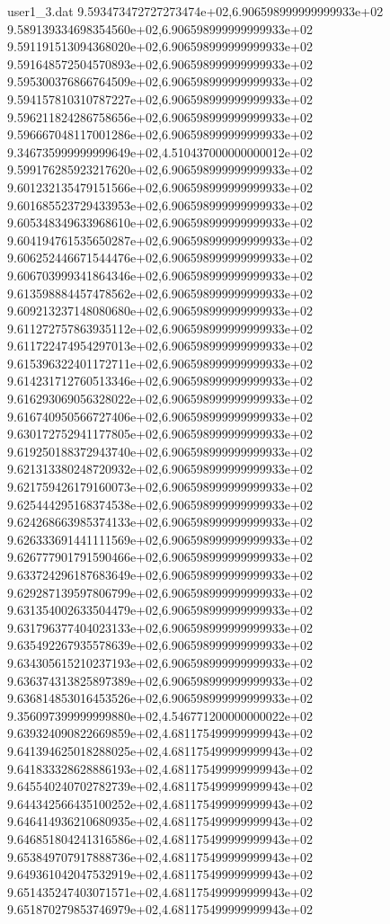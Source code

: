\begin{filecontents}{user1_3.dat}
9.593473472727273474e+02,6.906598999999999933e+02
9.589139334698354560e+02,6.906598999999999933e+02
9.591191513094368020e+02,6.906598999999999933e+02
9.591648572504570893e+02,6.906598999999999933e+02
9.595300376866764509e+02,6.906598999999999933e+02
9.594157810310787227e+02,6.906598999999999933e+02
9.596211824286758656e+02,6.906598999999999933e+02
9.596667048117001286e+02,6.906598999999999933e+02
9.346735999999999649e+02,4.510437000000000012e+02
9.599176285923217620e+02,6.906598999999999933e+02
9.601232135479151566e+02,6.906598999999999933e+02
9.601685523729433953e+02,6.906598999999999933e+02
9.605348349633968610e+02,6.906598999999999933e+02
9.604194761535650287e+02,6.906598999999999933e+02
9.606252446671544476e+02,6.906598999999999933e+02
9.606703999341864346e+02,6.906598999999999933e+02
9.613598884457478562e+02,6.906598999999999933e+02
9.609213237148080680e+02,6.906598999999999933e+02
9.611272757863935112e+02,6.906598999999999933e+02
9.611722474954297013e+02,6.906598999999999933e+02
9.615396322401172711e+02,6.906598999999999933e+02
9.614231712760513346e+02,6.906598999999999933e+02
9.616293069056328022e+02,6.906598999999999933e+02
9.616740950566727406e+02,6.906598999999999933e+02
9.630172752941177805e+02,6.906598999999999933e+02
9.619250188372943740e+02,6.906598999999999933e+02
9.621313380248720932e+02,6.906598999999999933e+02
9.621759426179160073e+02,6.906598999999999933e+02
9.625444295168374538e+02,6.906598999999999933e+02
9.624268663985374133e+02,6.906598999999999933e+02
9.626333691441111569e+02,6.906598999999999933e+02
9.626777901791590466e+02,6.906598999999999933e+02
9.633724296187683649e+02,6.906598999999999933e+02
9.629287139597806799e+02,6.906598999999999933e+02
9.631354002633504479e+02,6.906598999999999933e+02
9.631796377404023133e+02,6.906598999999999933e+02
9.635492267935578639e+02,6.906598999999999933e+02
9.634305615210237193e+02,6.906598999999999933e+02
9.636374313825897389e+02,6.906598999999999933e+02
9.636814853016453526e+02,6.906598999999999933e+02
9.356097399999999880e+02,4.546771200000000022e+02
9.639324090822669859e+02,4.681175499999999943e+02
9.641394625018288025e+02,4.681175499999999943e+02
9.641833328628886193e+02,4.681175499999999943e+02
9.645540240702782739e+02,4.681175499999999943e+02
9.644342566435100252e+02,4.681175499999999943e+02
9.646414936210680935e+02,4.681175499999999943e+02
9.646851804241316586e+02,4.681175499999999943e+02
9.653849707917888736e+02,4.681175499999999943e+02
9.649361042047532919e+02,4.681175499999999943e+02
9.651435247403071571e+02,4.681175499999999943e+02
9.651870279853746979e+02,4.681175499999999943e+02

\end{filecontents}
